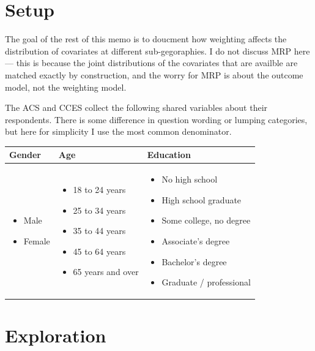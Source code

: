 \documentclass[11pt]{article}
\begin{document}
\section*{Setup}

The goal of the rest of this memo is to doucment how weighting affects the distribution of covariates at different sub-gegoraphies. I do not discuss MRP here --- this is because the joint distributions of the covariates that are availble are matched exactly by construction, and the worry for MRP is about the outcome model, not the weighting model.

The ACS and CCES collect the following shared variables about their respondents. There is some difference in question wording or lumping categories, but here for simplicity I use the most common denominator.


\begin{table}[!h]
\small
\begin{tabularx}{\linewidth}{XXX}
Gender & Age & Education\\\midrule
\begin{itemize}
\item Male
\item Female
\end{itemize} &
\begin{itemize}
\item 18 to 24 years
\item 25 to 34 years
\item 35 to 44 years
\item 45 to 64 years
\item 65 years and over
\end{itemize} &
\begin{itemize}
\item No high school
\item High school graduate
\item Some college, no degree
\item Associate's degree
\item Bachelor's degree
\item Graduate / professional
\end{itemize}
\end{tabularx}
\end{table}

\section*{Exploration}
\end{document}
